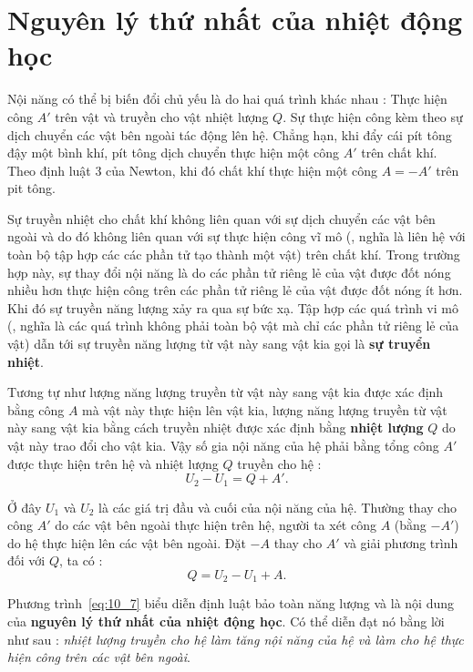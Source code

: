 \section{Nguyên lý thứ nhất của nhiệt động học}\label{sec:10_5}

Nội năng có thể bị biến đổi chủ yếu là do hai quá trình khác nhau : Thực hiện công $A'$ trên vật và truyền cho vật nhiệt lượng $Q$. Sự thực hiện công kèm theo sự dịch chuyển các vật bên ngoài tác động lên hệ. Chẳng hạn, khi đẩy cái pít tông đậy một bình khí, pít tông dịch chuyển thực hiện một công $A'$ trên chất khí. Theo định luật 3 của Newton, khi đó chất khí thực hiện một công $A=-A'$ trên pit tông.

Sự truyền nhiệt cho chất khí không liên quan với sự dịch chuyển các vật bên ngoài và do đó không liên quan với sự thực hiện công vĩ mô (\ie, nghĩa là liên hệ với toàn bộ tập hợp các các phần tử tạo thành một vật) trên chất khí. Trong trường hợp này, sự thay đổi nội năng là do các phần tử riêng lẻ của vật được đốt nóng nhiều hơn thực hiện công trên các phần tử riêng lẻ của vật được đốt nóng ít hơn. Khi đó sự truyền năng lượng xảy ra qua sự bức xạ. Tập hợp các quá trình vi mô (\ie, nghĩa là các quá trình không phải toàn bộ vật mà chỉ các phần tử riêng lẻ của vật) dẫn tới sự truyền năng lượng từ vật này sang vật kia gọi là \textbf{sự truyển nhiệt}.

Tương tự như lượng năng lượng truyền từ vật này sang vật kia được xác định bằng công $A$ mà vật này thực hiện lên vật kia, lượng năng lượng truyền từ vật này sang vật kia bằng cách truyền nhiệt được xác định bằng \textbf{nhiệt lượng} $Q$ do vật này trao đổi cho vật kia. Vậy số gia nội năng của hệ phải bằng tổng công $A'$ được thực hiện trên hệ và nhiệt lượng $Q$ truyền cho hệ :
\begin{equation}\label{eq:10_6}
	U_2 - U_1 = Q + A'.
\end{equation}

\noindent
Ở đây $U_1$ và $U_2$ là các giá trị đầu và cuối của nội năng của hệ. Thường thay cho công $A'$ do các vật bên ngoài thực hiện trên hệ, người ta xét công $A$ (bằng $-A'$) do hệ thực hiện lên các vật bên ngoài. Đặt $-A$ thay cho $A'$ và giải phương trình  đối với $Q$, ta có : 
\begin{equation}\label{eq:10_7}
	Q = U_2 - U_1 + A.
\end{equation}

Phương trình~\eqref{eq:10_7} biểu diễn định luật bảo toàn năng lượng và là nội dung của \textbf{nguyên lý thứ nhất của nhiệt động học}. Có thể diễn đạt nó bằng lời như sau : \textit{nhiệt lượng truyền cho hệ làm tăng nội năng của hệ và làm cho hệ thực hiện công trên các vật bên ngoài}.

